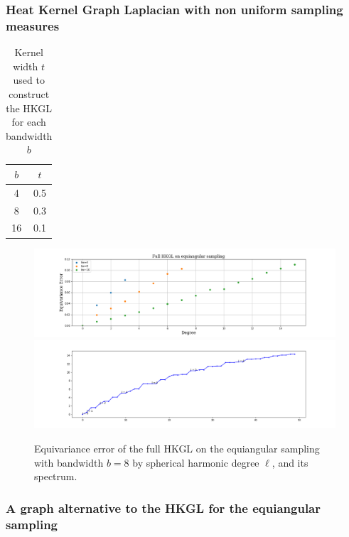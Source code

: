 \subsubsection{Heat Kernel Graph Laplacian with non uniform sampling measures}

\begin{table}[h!]
	\centering
	\begin{tabular}{ c|c } 
$b$ & $t$ \\ 
	\hline
4 & 0.5 \\ 
8 & 0.3 \\ 
16 & 0.1 \\ 
	\end{tabular}
	\caption{\label{table:equiangular kernel width}Kernel width $t$ used to construct the HKGL for each bandwidth $b$}
\end{table}

\begin{figure}[h!]
	\centering
	\includegraphics[width=\textwidth]{../codes/06.Equivariance_error/FullHKGLonequiangularsampling.png}
	\includegraphics[width=\textwidth]{../codes/02.HeatKernelGraphLaplacian/equiangular/equi_full_eigenvalues_16.png}
	\caption{\label{fig:Equivariance error of the full HKGL}Equivariance error of the full HKGL on the equiangular sampling with bandwidth $b=8$ by spherical harmonic degree $\ell$, and its spectrum.}
\end{figure}

\subsubsection{A graph alternative to the HKGL for the equiangular sampling}

